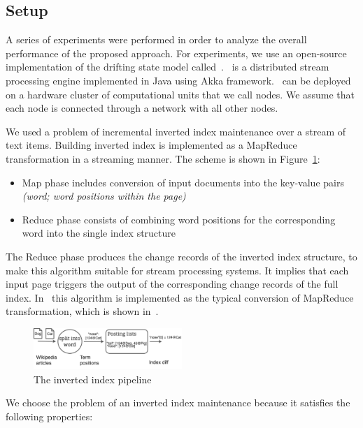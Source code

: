 
\label {fs-experiments-seciton}

\subsection{Setup}
A series of experiments were performed in order to analyze the overall performance of the proposed approach. For experiments, we use an open-source implementation of the drifting state model called~\FlameStream. \FlameStream\ is a distributed stream processing engine implemented in Java using Akka framework. \FlameStream\ can be deployed on a hardware cluster of computational units that we call nodes. We assume that each node is connected through a network with all other nodes.

We used a problem of incremental inverted index maintenance over a stream of text items. 
Building inverted index is implemented as a MapReduce transformation in a streaming manner. The scheme is shown in Figure~\ref{index}: 

\begin{itemize}
    \item Map phase includes conversion of input documents into the key-value pairs {\it (word; word positions within the page)}
    \item Reduce phase consists of combining word positions for the corresponding word into the single index structure 
\end{itemize}

The Reduce phase produces the change records of the inverted index structure, to make this algorithm suitable for stream processing systems. It implies that each input page triggers the output of the corresponding change records of the full index. In \FlameStream\ this algorithm is implemented as the typical conversion of MapReduce transformation, which is shown in~\cite{we2018seim}.

\begin{figure}[htbp]
  \centering
  \includegraphics[width=0.50\textwidth]{pics/index}
  \caption{The inverted index pipeline}
  \label {index}
\end{figure}

We choose the problem  of  an inverted index maintenance  because it satisfies the following properties:

